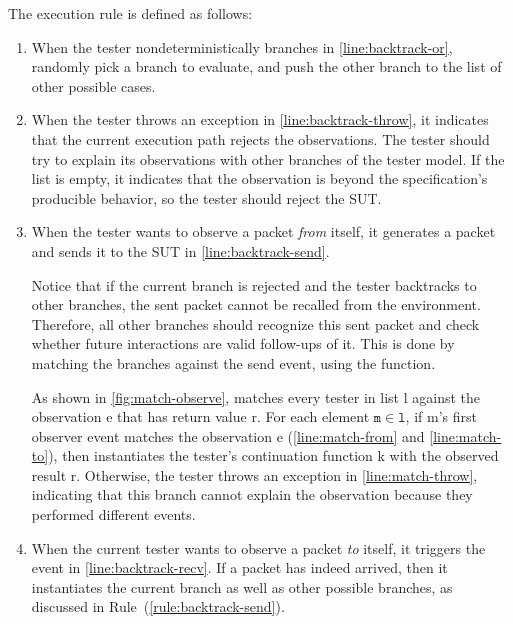 The execution rule is defined as follows:
\begin{enumerate}
\item When the tester nondeterministically branches
  in \autoref{line:backtrack-or}, randomly pick a branch  to
  evaluate, and push the other branch  to the list of other
  possible cases.

\item When the  tester throws an exception in
  \autoref{line:backtrack-throw}, it indicates that the current execution path
  rejects the observations.  The tester should try to explain its observations
  with other branches of the tester model.  If the  list is empty,
  it indicates that the observation is beyond the specification's producible
  behavior, so the tester should reject the SUT.

\item When the tester wants to observe a packet {\em from} itself, it generates
  a packet and sends it to the SUT in \autoref{line:backtrack-send}.

  Notice that if the current branch is rejected and the tester backtracks to
  other branches, the sent packet cannot be recalled from the environment.
  Therefore, all other branches should recognize this sent packet and check
  whether future interactions are valid follow-ups of it.  This is done by
  matching the branches against the send event, using the  function.

  As shown in \autoref{fig:match-observe},  matches every
  tester in list \ilc l against the observation \ilc e that has return
  value \ilc r.  For each element $\texttt m\in\texttt l$, if \ilc m's first
  observer event  matches the observation \ilc e
  (\autoref{line:match-from} and \autoref{line:match-to}),
  then  instantiates the tester's continuation function \ilc
  k with the observed result \ilc r.  Otherwise, the tester throws an exception
  in \autoref{line:match-throw}, indicating that this branch cannot explain the
  observation because they performed different events.
  \label{rule:backtrack-send}

\item When the current tester wants to observe a packet {\em to} itself, it
  triggers the  event in \autoref{line:backtrack-recv}.  If a
  packet has indeed arrived, then it instantiates the current branch as well as
  other possible branches, as discussed in Rule~(\ref{rule:backtrack-send}).


\end{enumerate}

